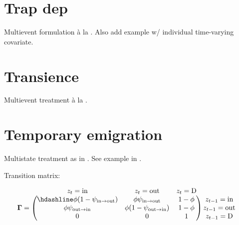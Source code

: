 \documentclass[
  12pt,
]{krantz}
\begin{document}
\hypertarget{trap-dep}{%
\section{Trap dep}\label{trap-dep}}

Multievent formulation à la \citet{pradeltrapdep2012}. Also add example w/ individual time-varying covariate.

\hypertarget{transience}{%
\section{Transience}\label{transience}}

Multievent treatment à la \citet{genovart2019}.

\hypertarget{temporary-emigration}{%
\section{Temporary emigration}\label{temporary-emigration}}

Multistate treatment as in \citet{schaub2004te}. See example in \citet{bancila2018te}.

Transition matrix:

\[
  \begin{matrix}
& \\
\mathbf{\Gamma} =
  \left ( \vphantom{ \begin{matrix} 12 \\ 12 \\ 12 \end{matrix} } \right .
          \end{matrix}
          \hspace{-1.2em}
          \begin{matrix}
          z_t=\text{in} & z_t=\text{out} & z_t=\text{D} \\ \hdashline
          \phi (1-\psi_{\text{in} \rightarrow \text{out}}) & \phi \psi_{\text{in} \rightarrow \text{out}} & 1 - \phi\\
          \phi \psi_{\text{out} \rightarrow \text{in}} & \phi (1-\psi_{\text{out} \rightarrow \text{in}}) & 1 - \phi\\
          0 & 0 & 1
          \end{matrix}
          \hspace{-0.2em}
          \begin{matrix}
          & \\
          \left . \vphantom{ \begin{matrix} 12 \\ 12 \\ 12 \end{matrix} } \right )
\begin{matrix}
z_{t-1}=\text{in} \\ z_{t-1}=\text{out} \\ z_{t-1}=\text{D}
\end{matrix}
\end{matrix}
\]
\end{document}
